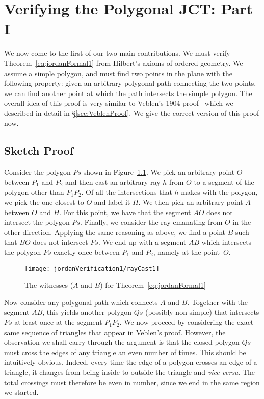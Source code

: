 \chapter{Verifying the Polygonal JCT: Part I}\label{chapter:JordanVerification1}
We now come to the first of our two main contributions. We must verify Theorem~\ref{eq:jordanFormal1} from Hilbert's axioms of ordered geometry. We assume a simple polygon, and must find two points in the plane with the following property: given an arbitrary polygonal path connecting the two points, we can find another point at which the path intersects the simple polygon. The overall idea of this proof is very similar to Veblen's 1904 proof~\cite{Veblenphd} which we described in detail in \S\ref{sec:VeblenProof}. We give the correct version of this proof now.

\section{Sketch Proof}\label{sec:ParityProofInformal}
Consider the polygon $Ps$ shown in Figure~\ref{fig:rayCast1}. We pick an arbitrary point $O$ between $P_1$ and $P_2$  and then cast an arbitrary ray $h$ from $O$ to a segment of the polygon other than $P_1P_2$. Of all the intersections that $h$ makes with the polygon, we pick the one closest to $O$ and label it $H$. We then pick an arbitrary point $A$ between $O$ and $H$. For this point, we have that the segment $AO$ does not intersect the polygon $Ps$. Finally, we consider the ray emanating from $O$ in the other direction. Applying the same reasoning as above, we find a point $B$ such that $BO$ does not intersect $Ps$. We end up with a segment $AB$ which intersects the polygon $Ps$ exactly once between $P_1$ and $P_2$, namely at the point~$O$.

\begin{figure}
\centering\texttt{[image: jordanVerification1/rayCast1]}
\caption{The witnesses ($A$ and $B$) for Theorem~\ref{eq:jordanFormal1}}
\label{fig:rayCast1}
\end{figure}

\newcommand{\insideoutsideclaim}{every time the edge of a polygon crosses an edge of a triangle, it changes from being inside to outside the triangle and \emph{vice versa}}

Now consider any polygonal path which connects $A$ and $B$. Together with the segment $AB$, this yields another polygon $Qs$ (possibly non-simple) that intersects $Ps$ at least once at the segment $P_1P_2$. We now proceed by considering the exact same sequence of triangles that appear in Veblen's proof. However, the observation we shall carry through the argument is that the closed polygon $Qs$ must cross the edges of any triangle an even number of times. This should be intuitively obvious. Indeed, \insideoutsideclaim. The total crossings must therefore be even in number, since we end in the same region we started.

